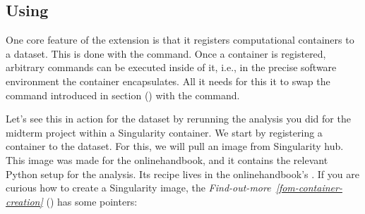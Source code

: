\subsection{Using }
\label{\detokenize{basics/101-133-containersrun:using-datalad-containers}}\label{\detokenize{basics/101-133-containersrun:index-2}}
\sphinxAtStartPar
One core feature of the  extension is that it registers
computational containers to a dataset. This is done with the
 command.
Once a container is registered, arbitrary commands can be executed inside of
it, i.e., in the precise software environment the container encapsulates. All it
needs for this it to swap the  command introduced in
section {\hyperref[\detokenize{basics/101-108-run:run}]{}} () with the  command.

\sphinxAtStartPar
Let’s see this in action for the  dataset by rerunning
the analysis you did for the midterm project within a Singularity container.
We start by registering a container to the dataset.
For this, we will pull an image from Singularity hub. This image was made
for the online\sphinxhyphen{}handbook, and it contains the relevant Python setup for
the analysis. Its recipe lives in the online\sphinxhyphen{}handbook’s
.
If you are curious how to create a Singularity image, the \textit{Find-out-more}~{\findoutmoreiconinline}\textit{\ref{fom-container-creation}} {\hyperref[\detokenize{basics/101-133-containersrun:fom-container-creation}]{}} () has some pointers:

